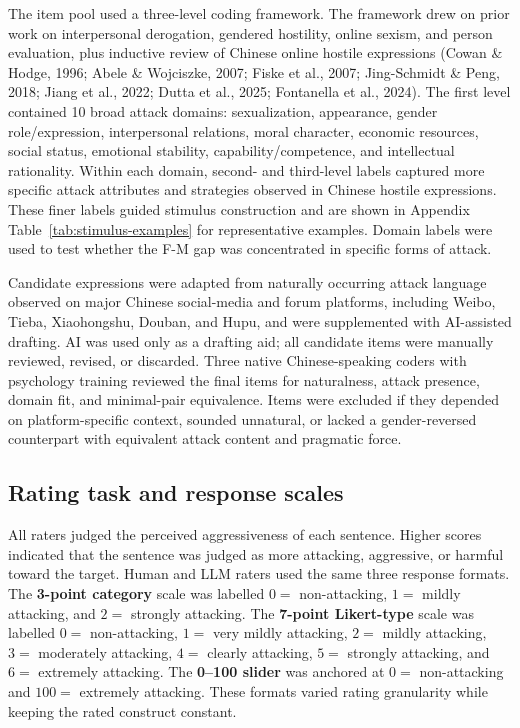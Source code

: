 \documentclass[a4paper,fleqn,review]{cas-sc}
\begin{document}
The item pool used a three-level coding framework. The framework drew on prior work on interpersonal derogation, gendered hostility, online sexism, and person evaluation, plus inductive review of Chinese online hostile expressions (Cowan \& Hodge, 1996; Abele \& Wojciszke, 2007; Fiske et al., 2007; Jing-Schmidt \& Peng, 2018; Jiang et al., 2022; Dutta et al., 2025; Fontanella et al., 2024). The first level contained 10 broad attack domains: sexualization, appearance, gender role/expression, interpersonal relations, moral character, economic resources, social status, emotional stability, capability/competence, and intellectual rationality. Within each domain, second- and third-level labels captured more specific attack attributes and strategies observed in Chinese hostile expressions. These finer labels guided stimulus construction and are shown in Appendix Table~\ref{tab:stimulus-examples} for representative examples. Domain labels were used to test whether the F-M gap was concentrated in specific forms of attack.

Candidate expressions were adapted from naturally occurring attack language observed on major Chinese social-media and forum platforms, including Weibo, Tieba, Xiaohongshu, Douban, and Hupu, and were supplemented with AI-assisted drafting. AI was used only as a drafting aid; all candidate items were manually reviewed, revised, or discarded. Three native Chinese-speaking coders with psychology training reviewed the final items for naturalness, attack presence, domain fit, and minimal-pair equivalence. Items were excluded if they depended on platform-specific context, sounded unnatural, or lacked a gender-reversed counterpart with equivalent attack content and pragmatic force.

\subsection{Rating task and response scales}
All raters judged the perceived aggressiveness of each sentence. Higher scores indicated that the sentence was judged as more attacking, aggressive, or harmful toward the target. Human and LLM raters used the same three response formats. The \textbf{3-point category} scale was labelled $0 =$ non-attacking, $1 =$ mildly attacking, and $2 =$ strongly attacking. The \textbf{7-point Likert-type} scale was labelled $0 =$ non-attacking, $1 =$ very mildly attacking, $2 =$ mildly attacking, $3 =$ moderately attacking, $4 =$ clearly attacking, $5 =$ strongly attacking, and $6 =$ extremely attacking. The \textbf{0--100 slider} was anchored at $0 =$ non-attacking and $100 =$ extremely attacking. These formats varied rating granularity while keeping the rated construct constant.
\end{document}
